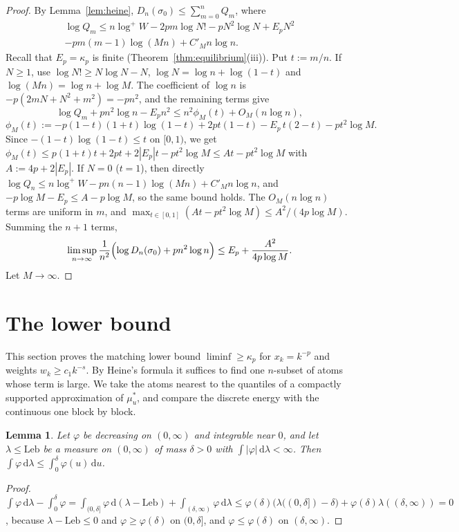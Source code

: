 \documentclass{amsart}
\newtheorem{lemma}[theorem]{Lemma}
\theoremstyle{definition}
\theoremstyle{remark}
\numberwithin{equation}{section}
\newcommand{\dd}{\,\mathrm{d}}
\newcommand{\Leb}{\mathrm{Leb}}
\begin{document}
\begin{proof}
By Lemma~\ref{lem:heine}, $D_n(\sigma_0)\le\sum_{m=0}^nQ_m$, where
\begin{multline*}
  \log Q_m\le n\log^+W-2pm\log N!-pN^2\log N+E_pN^2\\
  -pm(m-1)\log(Mn)+C'_Mn\log n .
\end{multline*}
Recall that $E_p=\kappa_p$ is finite (Theorem~\ref{thm:equilibrium}(iii)). Put $t:=m/n$. If $N\ge1$, use
$\log N!\ge N\log N-N$, $\log N=\log n+\log(1-t)$ and $\log(Mn)=\log n+\log M$.
The coefficient of $\log n$ is $-p(2mN+N^2+m^2)=-pn^2$, and the remaining terms give
\[
  \log Q_m+pn^2\log n-E_pn^2\le n^2\phi_M(t)+O_M(n\log n),
\]
\[
  \phi_M(t):=-p(1-t)(1+t)\log(1-t)+2pt(1-t)-E_p\,t(2-t)-pt^2\log M .
\]
Since $-(1-t)\log(1-t)\le t$ on $[0,1)$, we get $\phi_M(t)\le p(1+t)t+2pt+2|E_p|t-pt^2\log M\le At-pt^2\log M$ with
$A:=4p+2|E_p|$. If $N=0$ ($t=1$), then directly $\log Q_n\le n\log^+W-pn(n-1)\log(Mn)+C'_Mn\log n$, and
$-p\log M-E_p\le A-p\log M$, so the same bound holds. The $O_M(n\log n)$ terms are uniform in $m$, and
$\max_{t\in[0,1]}(At-pt^2\log M)\le A^2/(4p\log M)$. Summing the $n+1$ terms,
\[
  \limsup_{n\to\infty}\frac1{n^2}\Bigl(\log D_n(\sigma_0)+pn^2\log n\Bigr)\le E_p+\frac{A^2}{4p\log M}.
\]
Let $M\to\infty$.
\end{proof}

\section{The lower bound}\label{sec:lower}

This section proves the matching lower bound $\liminf\ge\kappa_p$ for $x_k=k^{-p}$ and weights $w_k\ge c_1k^{-s}$. By
Heine's formula it suffices to find one $n$-subset of atoms whose term is large. We take the atoms nearest to the
quantiles of a compactly supported approximation of $\mu^*_u$, and compare the discrete energy with the continuous one
block by block.

\begin{lemma}\label{lem:bathtub}
Let $\varphi$ be decreasing on $(0,\infty)$ and integrable near $0$, and let $\lambda\le\Leb$ be a measure on
$(0,\infty)$ of mass $\delta>0$ with $\int|\varphi|\dd\lambda<\infty$. Then $\int\varphi\dd\lambda\le\int_0^\delta
\varphi(u)\dd u$.
\end{lemma}

\begin{proof}
$\int\varphi\dd\lambda-\int_0^\delta\varphi=\int_{(0,\delta]}\varphi\dd(\lambda-\Leb)+\int_{(\delta,\infty)}\varphi\dd
\lambda\le\varphi(\delta)\bigl(\lambda((0,\delta])-\delta\bigr)+\varphi(\delta)\lambda((\delta,\infty))=0$, because
$\lambda-\Leb\le0$ and $\varphi\ge\varphi(\delta)$ on $(0,\delta]$, and $\varphi\le\varphi(\delta)$ on
$(\delta,\infty)$.
\end{proof}
\end{document}
